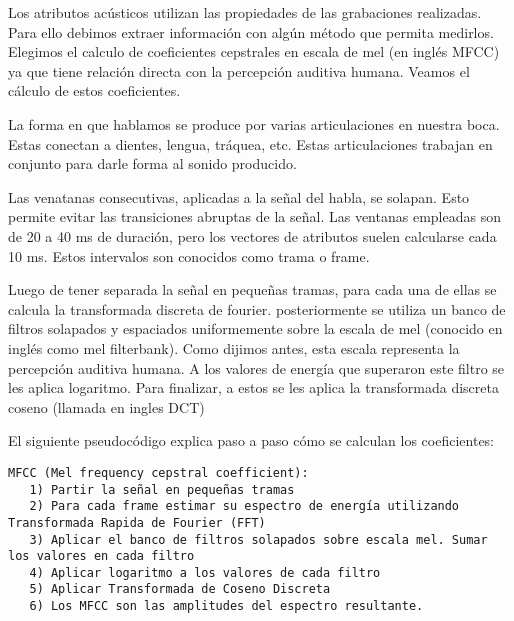 Los atributos acústicos utilizan las propiedades de las grabaciones realizadas. Para ello debimos extraer información con algún método que permita medirlos. Elegimos el calculo de coeficientes cepstrales en escala de mel (en inglés MFCC) ya que tiene relación directa con la percepción auditiva humana. Veamos el cálculo de estos coeficientes.

La forma en que hablamos se produce por varias articulaciones en nuestra boca. Estas conectan a dientes, lengua, tráquea, etc. Estas articulaciones trabajan en conjunto para darle forma al sonido producido. 



Las venatanas consecutivas, aplicadas a la señal del habla, se solapan. Esto permite evitar las transiciones abruptas de la señal. Las ventanas empleadas son de 20 a 40 ms de duración, pero los vectores de atributos suelen calcularse cada 10 ms. Estos intervalos son conocidos como trama o frame.

Luego de tener separada la señal en pequeñas tramas, para cada una de ellas se calcula la transformada discreta de fourier. posteriormente se utiliza un banco de filtros solapados y espaciados uniformemente sobre la escala de mel (conocido en inglés como mel filterbank). Como dijimos antes, esta escala representa la percepción auditiva humana. A los valores de energía que superaron este filtro se les aplica logaritmo. Para finalizar, a estos se les aplica la transformada discreta coseno (llamada en ingles DCT)

El siguiente pseudocódigo explica paso a paso cómo se calculan los coeficientes:
\begin{lstlisting}[numbers=none, keywordstyle=\ttfamily]
   MFCC (Mel frequency cepstral coefficient):
   1) Partir la señal en pequeñas tramas 
   2) Para cada frame estimar su espectro de energía utilizando Transformada Rapida de Fourier (FFT)
   3) Aplicar el banco de filtros solapados sobre escala mel. Sumar los valores en cada filtro
   4) Aplicar logaritmo a los valores de cada filtro
   5) Aplicar Transformada de Coseno Discreta
   6) Los MFCC son las amplitudes del espectro resultante.
\end{lstlisting}


